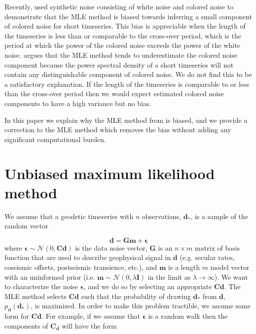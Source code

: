 \documentclass[10pt,a4paper]{article}
\begin{document}
Recently, \citep{Langbein2012} used synthetic noise consisting of white noise and colored noise to demonstrate that the MLE method is biased towards inferring a small component of colored noise for short timeseries.  This bias is appreciable when the length of the timeseries is less than or comparable to the cross-over period, which is the period at which the power of the colored noise exceeds the power of the white noise. \citet{Langbein2012} argues that the MLE method tends to underestimate the colored noise component because the power spectral density of a short timeseries will not contain any distinguishable component of colored noise. We do not find this to be a satisfactory explanation. If the length of the timeseries is comparable to or less than the cross-over period then we would expect estimated colored noise components to have a high variance but no bias. 

In this paper we explain why the MLE method from \citet{Langbein1997} is biased, and we provide a correction to the MLE method which removes the bias without adding any significant computational burden. 

\section{Unbiased maximum likelihood method}

We assume that a geodetic timeseries with $n$ observations, $\mathbf{d_*}$, is a sample of the random vector

\begin{equation}\label{LangbeinModel}
  \mathbf{d} = \mathbf{Gm} + \mathbf{\epsilon}
\end{equation}
where $\mathbf{\epsilon} \sim \mathcal{N}(0,\mathbf{Cd})$ is the data noise vector, $\mathbf{G}$ is an $n \times m$ matrix of basis function that are used to describe geophysical signal in $\mathbf{d}$ (e.g. secular rates, coseismic offsets, postseismic transience, etc.), and $\mathbf{m}$ is a length $m$ model vector with an uninformed prior (i.e. $\mathbf{m} \sim \mathcal{N}(0,\lambda\mathbf{I})$ in the limit as $\lambda \to \infty$).  We want to characterize the noise $\mathbf{\epsilon}$, and we do so by selecting an appropriate $\mathbf{Cd}$.  The MLE method selects $\mathbf{Cd}$ such that the probability of drawing $\mathbf{d_*}$ from $\mathbf{d}$, $p_\mathbf{d}(\mathbf{d_*})$, is maximized. In order to make this problem tractible, we assume  some form for $\mathbf{Cd}$. For example, if we assume that $\mathbf{\epsilon}$ is a random walk then the components of $\mathbf{C_d}$ will have the form
\end{document}
